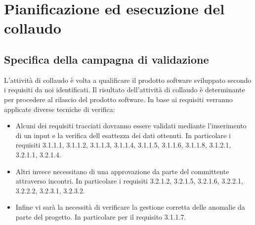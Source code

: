 \documentclass[11pt,titlepage,a4paper]{report}
\begin{document}
\chapter{Pianificazione ed esecuzione del collaudo}
\section{Specifica della campagna di validazione}
L'attivit\`a di collaudo \`e volta a qualificare il prodotto software sviluppato secondo i requisiti da noi identificati. Il risultato dell'attivit\`a di collaudo \`e determinante per procedere al rilascio del prodotto software. In base ai requisiti verranno applicate diverse tecniche di verifica:
\begin{itemize}
\item Alcuni dei requisiti tracciati dovranno essere validati mediante l'inserimento di un input e la verifica dell esattezza dei dati ottenuti. In particolare i requisiti 3.1.1.1, 3.1.1.2, 3.1.1.3, 3.1.1.4, 3.1.1.5, 3.1.1.6, 3.1.1.8, 3.1.2.1, 3.2.1.1, 3.2.1.4.
\item Altri invece necessitano di una approvazione da parte del committente attraverso incontri. In particolare i requisiti 3.2.1.2, 3.2.1.5, 3.2.1.6, 3.2.2.1, 3.2.2.2, 3.2.3.1, 3.2.3.2.
\item Infine vi sar\`a la necessit\`a di verificare la gestione corretta delle anomalie da parte del progetto. In particolare per il requisito 3.1.1.7.
\end{itemize}
\end{document}
